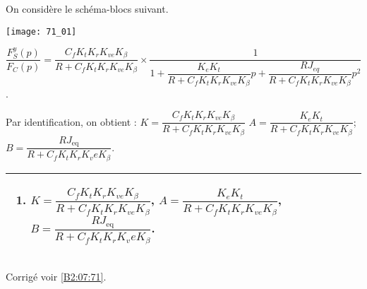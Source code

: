 \normalfalse \difficiletrue \tdifficilefalse
\correctiontrue


\setcounter{question}{0}
\ifcorrection
\else
{}
\fi

\ifprof
\else

On considère le schéma-blocs suivant.
\begin{center}
\texttt{[image: 71\_01]}
\end{center}
\fi
{}
\ifprof
\begin{corrige}

$\dfrac{F_S^y (p)}{F_C (p)}=\dfrac{C_f K_t K_r K_{ve} K_{\beta}}{R+C_f K_t K_r K_{ve} K_{\beta} } \times \dfrac{1}{1+\dfrac{K_e K_t}{R+C_f K_t K_r K_{ve} K_{\beta} }p+\dfrac{RJ_{eq}}{R+C_f K_t K_r K_{ve} K_{\beta} } p^2}$.


Par identification, on obtient :
$K=\dfrac{C_f K_t K_r K_{ve} K_{\beta}}{R+C_f K_t K_r K_{ve} K_{\beta}}$
$A=\dfrac{K_e K_t}{R+C_f K_t K_r K_{ve} K_{\beta} }$;
$B=\dfrac{RJ_{\text{eq}}}{R+C_f K_t K_r K_ve K_{\beta} }$.

\end{corrige}
\else
\fi

 
 \ifprof
\else
\ifcolle
\else
\footnotesize
\noindent
\begin{tabular}{|p{.95\linewidth}|}
\hline
\begin{enumerate}
\item $K=\dfrac{C_f K_t K_r K_{ve} K_{\beta}}{R+C_f K_t K_r K_{ve} K_{\beta}}$,
$A=\dfrac{K_e K_t}{R+C_f K_t K_r K_{ve} K_{\beta} }$,
$B=\dfrac{RJ_{\text{eq}}}{R+C_f K_t K_r K_ve K_{\beta} }$.
\end{enumerate} \\ \hline
\end{tabular}
\normalsize
\fi

\fi


\ifprof
\else
\begin{flushright}
\footnotesize{Corrigé  voir \ref{B2:07:71}.}
\end{flushright}%
\fi